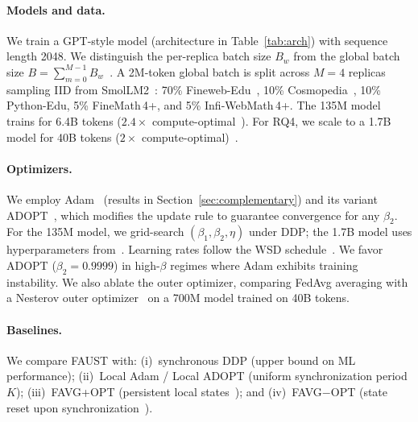 \documentclass{article}
\begin{document}
\paragraph{Models and data.}
We train a GPT-style model (architecture in
Table~\ref{tab:arch}) with sequence length 2048. We distinguish the
per-replica batch size $B_w$ from the global batch size
$B = \sum_{m=0}^{M-1} B_w$~\citep{sani2024photonfederatedllmpretraining}. A 2M-token global
batch is split across $M = 4$ replicas sampling IID from
SmolLM2~\citep{allal2025smollm2}: 70\% Fineweb-Edu~\citep{sardana2025chinchillaoptimalaccountinginferencelanguage},
10\% Cosmopedia~\citep{benallal2024cosmopedia}, 10\% Python-Edu,
5\% FineMath\,4+, and 5\% Infi-WebMath\,4+. The 135M model trains for
6.4B tokens ($2.4\times$ compute-optimal~\citep{hoffmann2022trainingcomputeoptimallargelanguage}).
For RQ4, we scale to a 1.7B model for 40B tokens
($2\times$ compute-optimal)~\citep{sardana2025chinchillaoptimalaccountinginferencelanguage}.

\paragraph{Optimizers.}
We employ Adam~\citep{kingma2017adammethodstochasticoptimization} (results in
Section~\ref{sec:complementary}) and its variant
ADOPT~\citep{taniguchi2024adoptmodifiedadamconverge}, which modifies the update rule to
guarantee convergence for any $\beta_2$. For the 135M model, we
grid-search $(\beta_1, \beta_2, \eta)$ under DDP; the 1.7B model uses
hyperparameters from~\citet{allal2025smollm2,taniguchi2024adoptmodifiedadamconverge}.
Learning rates follow the WSD
schedule~\citep{hagele2024scaling,allal2025smollm2}. We favor ADOPT
($\beta_2 = 0.9999$) in high-$\beta$ regimes where Adam exhibits
training instability. We also ablate the outer optimizer, comparing
FedAvg averaging with a Nesterov outer
optimizer~\citep{reddi2021adaptivefederatedoptimization,douillard2024dilocodistributedlowcommunicationtraining,zhuansun2024communicationefficientfederatedlearningadaptive}
on a 700M model trained on 40B tokens.

\paragraph{Baselines.}
\label{sec:baselines}
We compare FAUST with: (i)~synchronous DDP (upper bound on ML
performance); (ii)~Local Adam / Local ADOPT (uniform synchronization
period $K$); (iii)~FAVG+OPT (persistent local
states~\citep{sani2024photonfederatedllmpretraining,douillard2024dilocodistributedlowcommunicationtraining}); and
(iv)~FAVG$-$OPT (state reset upon
synchronization~\citep{sani2024futurelargelanguagemodel,zhang2024deptdecoupledprompttuning}).
\end{document}
